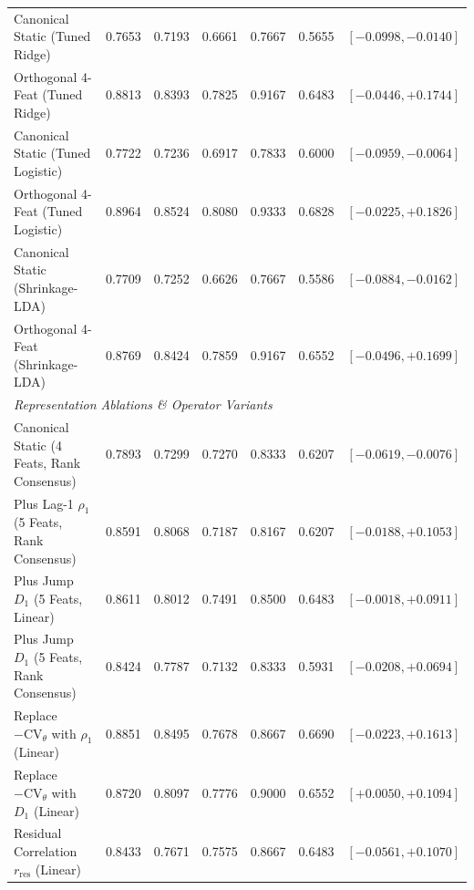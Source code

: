\begin{table}[t]
\begin{tabular}{lcccccc}
\quad Canonical Static (Tuned Ridge) & 0.7653 & 0.7193 & 0.6661 & 0.7667 & 0.5655 & {$[-0.0998, -0.0140]$} \\
\quad Orthogonal 4-Feat (Tuned Ridge) & 0.8813 & 0.8393 & 0.7825 & 0.9167 & 0.6483 & {$[-0.0446, +0.1744]$} \\
\quad Canonical Static (Tuned Logistic) & 0.7722 & 0.7236 & 0.6917 & 0.7833 & 0.6000 & {$[-0.0959, -0.0064]$} \\
\quad Orthogonal 4-Feat (Tuned Logistic) & 0.8964 & 0.8524 & 0.8080 & 0.9333 & 0.6828 & {$[-0.0225, +0.1826]$} \\
\quad Canonical Static (Shrinkage-LDA) & 0.7709 & 0.7252 & 0.6626 & 0.7667 & 0.5586 & {$[-0.0884, -0.0162]$} \\
\quad Orthogonal 4-Feat (Shrinkage-LDA) & 0.8769 & 0.8424 & 0.7859 & 0.9167 & 0.6552 & {$[-0.0496, +0.1699]$} \\
\hline
\multicolumn{7}{l}{\textit{Representation Ablations \& Operator Variants}} \\
\hline
\quad Canonical Static (4 Feats, Rank Consensus) & 0.7893 & 0.7299 & 0.7270 & 0.8333 & 0.6207 & {$[-0.0619, -0.0076]$} \\
\quad Plus Lag-1 $\rho_1$ (5 Feats, Rank Consensus) & 0.8591 & 0.8068 & 0.7187 & 0.8167 & 0.6207 & {$[-0.0188, +0.1053]$} \\
\quad Plus Jump $D_1$ (5 Feats, Linear) & 0.8611 & 0.8012 & 0.7491 & 0.8500 & 0.6483 & {$[-0.0018, +0.0911]$} \\
\quad Plus Jump $D_1$ (5 Feats, Rank Consensus) & 0.8424 & 0.7787 & 0.7132 & 0.8333 & 0.5931 & {$[-0.0208, +0.0694]$} \\
\quad Replace $-\mathrm{CV}_\theta$ with $\rho_1$ (Linear) & 0.8851 & 0.8495 & 0.7678 & 0.8667 & 0.6690 & {$[-0.0223, +0.1613]$} \\
\quad Replace $-\mathrm{CV}_\theta$ with $D_1$ (Linear) & 0.8720 & 0.8097 & 0.7776 & 0.9000 & 0.6552 & {$[+0.0050, +0.1094]$} \\
\quad Residual Correlation $r_{\text{res}}$ (Linear) & 0.8433 & 0.7671 & 0.7575 & 0.8667 & 0.6483 & {$[-0.0561, +0.1070]$} \\
\hline
\end{tabular}
\end{table}
